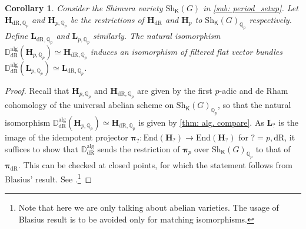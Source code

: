 \documentclass[11pt, letterpaper]{amsart}
\theoremstyle{plain}
\newtheorem{corollary}[theorem]{Corollary}
\theoremstyle{definition}
\newcommand{\ID}{\mathbb{D}}
\newcommand{\IQ}{\mathbb{Q}}
\newcommand{\End}{\mathrm{End}}
\newcommand{\<}{\langle}
\renewcommand{\>}{\rangle}
\newcommand{\Sh}{\mathrm{Sh}}
\newcommand{\bL}{\mathbf{L}}
\newcommand{\sfK}{\mathsf{K}}
\newcommand{\bH}{\mathbf{H}}
\newcommand{\dR}{\mathrm{dR}}
\newcommand{\bpi}{\boldsymbol{\pi}}
\begin{document}
\begin{corollary}
\label{cor: DdR on Sh}
    Consider the Shimura variety $\Sh_\sfK(G)$ in \cref{sub: period_setup}. Let $\bH_{\dR, \IQ_p}$ and $\bH_{p, \IQ_p}$ be the restrictions of $\bH_\dR$ and $\bH_{p}$ to $\Sh_\sfK(G)_{\IQ_p}$ respectively. Define $\bL_{\dR, \IQ_p}$ and $\bL_{p, \IQ_p}$ similarly.  The natural isomorphism $\ID_\dR^{\mathrm{alg}}(\bH_{p, \IQ_p}) \simeq \bH_{\dR, \IQ_p}$ induces an isomorphism of filtered flat vector bundles $\ID^{\mathrm{alg}}_\dR(\bL_{p, \IQ_p}) \simeq \bL_{\dR, \IQ_p}$. 
\end{corollary}
\begin{proof}
    Recall that $\bH_{p, \IQ_p}$ and $\bH_{\dR, \IQ_p}$ are given by the first $p$-adic and de Rham cohomology of the universal abelian scheme on $\Sh_\sfK(G)_{\IQ_p}$, so that the natural isomorphism $\ID_\dR^{\mathrm{alg}}(\bH_{p, \IQ_p}) \simeq \bH_{\dR, \IQ_p}$ is given by \cref{thm: alg. compare}. As $\bL_{?}$ is the image of the idempotent projector $\bpi_? : \End(\bH_?) \to \End(\bH_?)$ for $? = p, \dR$, it suffices to show that $\ID_\dR^{\mathrm{alg}}$ sends the restriction of $\bpi_p$ over $\Sh_\sfK(G)_{\IQ_p}$ to that of $\bpi_\dR$. This can be checked at closed points, for which the statement follows from Blasius' result. See \cite[Prop.~4.7]{CSpin}.\footnote{Note that here we are only talking about abelian varieties. The usage of Blasius result is to be avoided only for matching isomorphisms.}
\end{proof}
\end{document}
